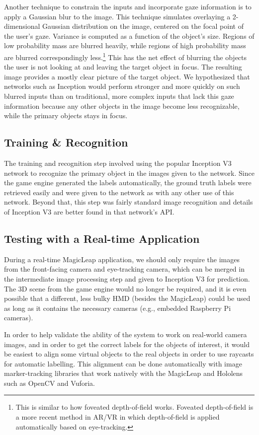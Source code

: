 Another technique to constrain the inputs and incorporate gaze information is to
apply a Gaussian blur to the image. This technique simulates overlaying a
2-dimensional Gaussian distribution on the image, centered on the focal point of
the user's gaze. Variance is computed as a function of the object's size.
Regions of low probability mass are blurred heavily, while regions of high
probability mass are blurred correspondingly less.\footnote{This is similar to
how foveated depth-of-field works. Foveated depth-of-field is a more recent
method in AR/VR in which depth-of-field is applied automatically based on
eye-tracking.} This has the net effect of blurring the objects the user is not
looking at and leaving the target object in focus. The resulting image provides
a mostly clear picture of the target object. We hypothesized that networks such
as Inception would perform stronger and more quickly on such blurred inputs than
on traditional, more complex inputs that lack this gaze information because any
other objects in the image become less recognizable, while the primary objects
stays in focus.


\subsection{Training \& Recognition}

The training and recognition step involved using the popular Inception V3
network to recognize the primary object in the images given to the network.
Since the game engine generated the labels automatically, the ground truth
labels were retrieved easily and were given to the network as with any other use
of this network. Beyond that, this step was fairly standard image recognition and
details of Inception V3 are better found in that network's API\@.

\subsection{Testing with a Real-time Application}

During a real-time MagicLeap application, we should only require the images from
the front-facing camera and eye-tracking camera, which can be merged in the
intermediate image processing step and given to Inception V3 for prediction. The
3D scene from the game engine would no longer be required, and it is even
possible that a different, less bulky HMD (besides the MagicLeap) could be used
as long as it contains the necessary cameras (e.g., embedded Raspberry Pi
cameras).

In order to help validate the ability of the system to work on real-world camera
images, and in order to get the correct labels for the objects of interest, it
would be easiest to align some virtual objects to the real objects in order to
use raycasts for automatic labelling. This alignment can be done automatically
with image marker-tracking libraries that work natively with the MagicLeap and
Hololens such as OpenCV and Vuforia.
